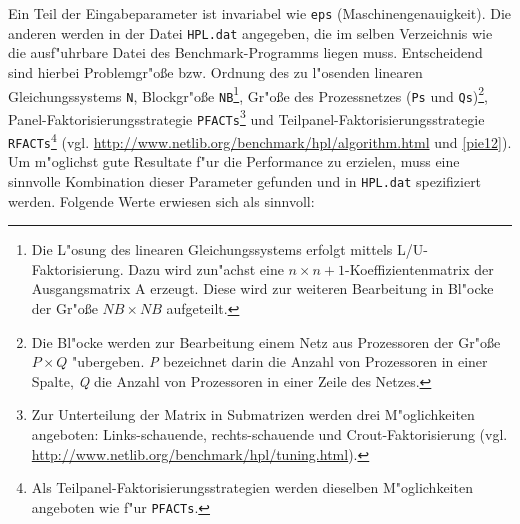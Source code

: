 Ein Teil der Eingabeparameter ist invariabel wie \texttt{eps} (Maschinengenauigkeit). Die anderen werden in der Datei \texttt{HPL.dat} angegeben, die im selben Verzeichnis wie die ausf"uhrbare Datei des Benchmark-Programms liegen muss. Entscheidend sind hierbei Problemgr"o\ss e bzw. Ordnung des zu l"osenden linearen Gleichungssystems \texttt{N}, Blockgr"o\ss e \texttt{NB}\footnote{Die L"osung des linearen Gleichungssystems erfolgt mittels L/U-Faktorisierung. Dazu wird zun"achst eine $n\times n+1$-Koeffizientenmatrix der Ausgangsmatrix A erzeugt. Diese wird zur weiteren Bearbeitung in Bl"ocke der Gr"o\ss e $NB\times NB$ aufgeteilt.}, Gr"o\ss e des Prozessnetzes (\texttt{Ps} und \texttt{Qs})\footnote{Die Bl"ocke werden zur Bearbeitung einem Netz aus Prozessoren der Gr"o\ss e $P\times Q$ "ubergeben. \textit{P} bezeichnet darin die Anzahl von Prozessoren in einer Spalte, \textit{Q} die Anzahl von Prozessoren in einer Zeile des Netzes.}, Panel-Faktorisierungsstrategie \texttt{PFACTs}\footnote{Zur Unterteilung der Matrix in Submatrizen werden drei M"oglichkeiten angeboten: Links-schauende, rechts-schauende und Crout-Faktorisierung (vgl. \url{http://www.netlib.org/benchmark/hpl/tuning.html}).} und Teilpanel-Faktorisierungsstrategie \texttt{RFACTs}\footnote{Als Teilpanel-Faktorisierungsstrategien werden dieselben M"oglichkeiten angeboten wie f"ur \texttt{PFACTs}.} (vgl. \url{http://www.netlib.org/benchmark/hpl/algorithm.html} und \ref{pie12}). Um m"og\-lichst gute Resultate f"ur die Performance zu erzielen, muss eine sinnvolle Kombination dieser Parameter gefunden und in \texttt{HPL.dat} spezifiziert werden. Folgende Werte erwiesen sich als sinnvoll: 
